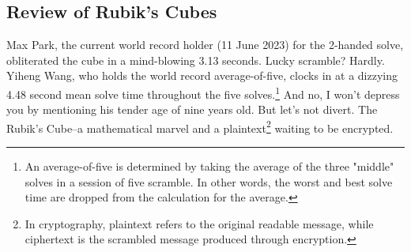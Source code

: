 \documentclass[12pt]{article}
\begin{document}
\subsection{Review of Rubik's Cubes}

Max Park, the current world record holder (11 June 2023) for the 2-handed solve, obliterated the cube in a mind-blowing 3.13 seconds. Lucky scramble? Hardly. Yiheng Wang, who holds the world record average-of-five, clocks in at a dizzying 4.48 second mean solve time throughout the five solves.\footnote{An average-of-five is determined by taking the average of the three "middle" solves in a session of five scramble. In other words, the worst and best solve time are dropped from the calculation for the average.} And no, I won't depress you by mentioning his tender age of nine years old. But let's not divert. The Rubik's Cube--a mathematical marvel and a plaintext\footnote{In cryptography, plaintext refers to the original readable message, while ciphertext is the scrambled message produced through encryption.} waiting to be encrypted. \\
\end{document}
